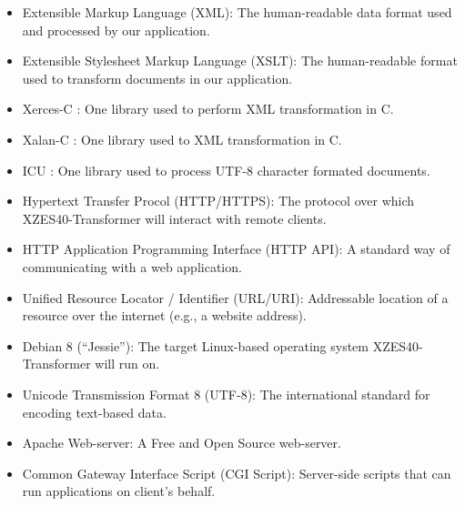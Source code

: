 \begin{itemize}
  \item Extensible Markup Language (XML): The human-readable data format used and processed by our application.
  \item Extensible Stylesheet Markup Language (XSLT): The human-readable format used to transform documents in our application.
  \item Xerces-C \cite{xerces}: One library used to perform XML transformation in C.
  \item Xalan-C \cite{xalan}: One library used to XML transformation in C.
  \item ICU \cite{icu}: One library used to process UTF-8 character formated documents.
  \item Hypertext Transfer Procol (HTTP/HTTPS): The protocol over which XZES40-Transformer will interact with remote clients.
  \item HTTP Application Programming Interface (HTTP API): A standard way of communicating with a web application.
  \item Unified Resource Locator / Identifier (URL/URI): Addressable location of a resource over the internet (e.g., a website address).
  \item Debian 8 (``Jessie''): The target Linux-based operating system XZES40-Transformer will run on.
  \item Unicode Transmission Format 8 (UTF-8): The international standard for encoding text-based data.
  \item Apache Web-server: A Free and Open Source web-server.
  \item Common Gateway Interface Script (CGI Script): Server-side scripts that can run applications on client's behalf.
\end{itemize}
% 
% 
